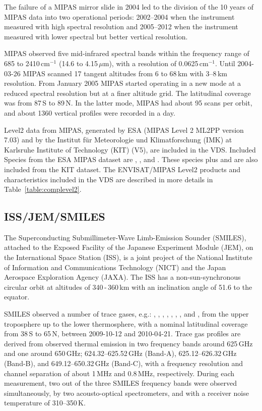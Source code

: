 The failure of a MIPAS mirror slide in 2004 led to the 
division of the 10 years of MIPAS
data into two operational periods: 2002--2004 when the 
instrument measured with high spectral resolution 
and 2005--2012 when the instrument measured with lower 
spectral but better vertical resolution.

MIPAS observed five mid-infrared spectral bands within the
frequency range of 685 to 2410\,cm\(^{-1}\) (14.6 to 4.15\,\(\mu\)m),
with a resolution of 0.0625\,cm\(^{-1}\).
Until 2004-03-26 MIPAS scanned 17 tangent altitudes from 
6 to 68\,km with 3--8\,km resolution.
From January 2005 MIPAS started operating in a new mode
at a reduced spectral resolution but at a finer altitude
grid. The latitudinal coverage was from 87\degree\,S to 89\degree\,N.
In the latter mode, MIPAS had about 95 scans per orbit, and about
1360 vertical profiles were recorded in a day.

Level2 data from MIPAS, generated by ESA
(MIPAS Level 2 ML2PP version 7.03)
and by the Institut f\"ur Meteorologie und Klimatforschung
(IMK) at Karlsruhe Institute of Technology (KIT) (V5), are
included in the VDS.
Included Species from the ESA MIPAS dataset are
, , and .
These species plus  and  are also included from the KIT
dataset. The ENVISAT/MIPAS Level2 products and characteristics included in the
VDS are described in more details in Table~\ref{table:complevel2}.


\subsection{ISS/JEM/SMILES}

The Superconducting Submillimeter-Wave Limb-Emission Sounder (SMILES),
attached to the Exposed Facility of the Japanese Experiment Module (JEM), 
on the International Space Station (ISS), is a joint project of the
National Institute of Information and Communications Technology (NICT) and
the Japan Aerospace Exploration Agency (JAXA).
The ISS has a non-sun-synchronous circular orbit at
altitudes of 340\,-\,360\,km with an inclination angle of 51.6\degree
to the equator. 

SMILES observed a number of trace gases, e.g.: , , 
, , , , , and , 
from the upper troposphere up to the lower thermosphere,  
with a nominal latitudinal coverage 
from 38\degree\,S to 65\degree\,N, between 2009-10-12 and 2010-04-21.
Trace gas profiles are derived from observed thermal emission in two frequency
bands around 625\,GHz and one around 650\,GHz;
624.32--625.52\,GHz (Band-A), 625.12--626.32\,GHz (Band-B),
and 649.12--650.32\,GHz (Band-C), with a frequency resolution
and channel separation of about 1\,MHz and 0.8\,MHz, 
respectively.  
During each measurement, two out of the three SMILES frequency
bands were observed simultaneously, by two acousto-optical spectrometers,
and with a receiver noise temperature of 310--350\,K.

